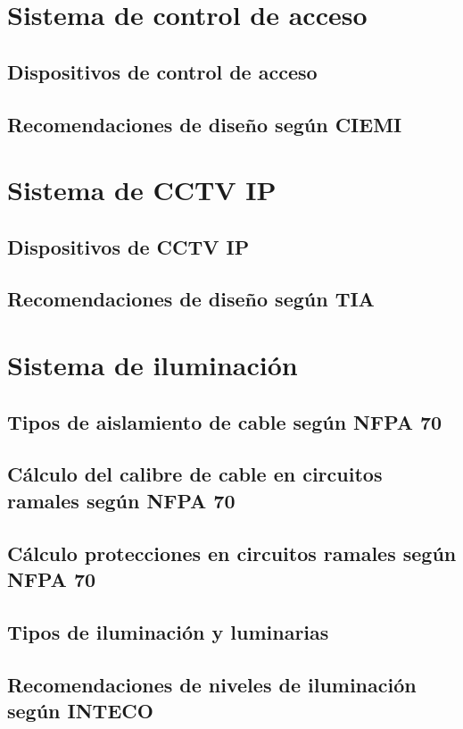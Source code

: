 \section{Sistema de control de acceso}


\subsection{Dispositivos de control de acceso}

\subsection{Recomendaciones de diseño según CIEMI}


\newpage


\section{Sistema de CCTV IP}


\subsection{Dispositivos de CCTV IP}

\subsection{Recomendaciones de diseño según TIA}


\newpage


\section{Sistema de iluminación}


\subsection{Tipos de aislamiento de cable según NFPA 70}

\subsection{Cálculo del calibre de cable en circuitos ramales según NFPA 70}

\subsection{Cálculo protecciones en circuitos ramales según NFPA 70}

\subsection{Tipos de iluminación y luminarias}

\subsection{Recomendaciones de niveles de iluminación según INTECO}
















